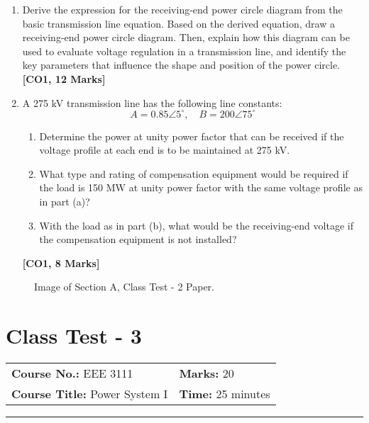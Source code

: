 \documentclass[12pt, a4paper]{article}
\begin{document}
	\begin{enumerate}[label=\textbf{\arabic*.}]
		\item Derive the expression for the receiving-end power circle diagram from the basic transmission line equation. Based on the derived equation, draw a receiving-end power circle diagram. Then, explain how this diagram can be used to evaluate voltage regulation in a transmission line, and identify the key parameters that influence the shape and position of the power circle. \hfill \textbf{[CO1, 12 Marks]}
		
		\item A 275 kV transmission line has the following line constants:
		\[ A = 0.85 \angle 5^\circ, \quad B = 200 \angle 75^\circ \]
		\begin{enumerate}[label=\textbf{(\alph*)}]
			\item Determine the power at unity power factor that can be received if the voltage profile at each end is to be maintained at 275 kV.
			\item What type and rating of compensation equipment would be required if the load is 150 MW at unity power factor with the same voltage profile as in part (a)?
			\item With the load as in part (b), what would be the receiving-end voltage if the compensation equipment is not installed?
		\end{enumerate}
		\hfill \textbf{[CO1, 8 Marks]}
	\end{enumerate}
	
	\begin{figure}[h!]
		\centering
		\caption{Image of Section A, Class Test - 2 Paper.}
	\end{figure}
	
	\newpage
	
	\section{Class Test - 3}
	\begin{tabular}{ll}
		\textbf{Course No.:} EEE 3111 & \textbf{Marks:} 20 \\
		\textbf{Course Title:} Power System I & \textbf{Time:} 25 minutes \\
	\end{tabular}
	\hrule
	\vspace{0.5cm}
	
\end{document}
